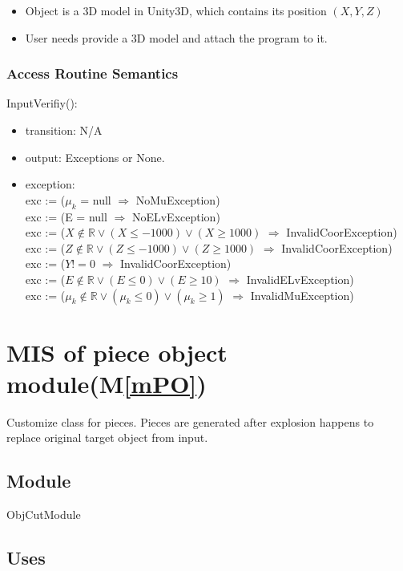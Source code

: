\documentclass[12pt, titlepage]{article}
\newcommand{\mref}[1]{M\ref{#1}}
\begin{document}
\begin{itemize}
	\item Object is a 3D model in Unity3D, which contains its position $(X,Y,Z)$
	\item User needs provide a 3D model and attach the program to it.
\end{itemize}
\subsubsection{Access Routine Semantics}

\noindent InputVerifiy():
\begin{itemize}
\item transition: N/A
\item output: Exceptions or None.
\item exception:\\
exc := ($\mu_{k}$ = null $\Rightarrow $ NoMuException)\\
exc := (E = null $\Rightarrow $ NoELvException)\\
exc := ($X \notin \mathbb{R} \vee (X \le -1000) \vee (X \ge 1000)$ $\Rightarrow $ InvalidCoorException)\\
exc := ($Z \notin \mathbb{R} \vee (Z \le -1000) \vee (Z \ge 1000)$ $\Rightarrow $ InvalidCoorException)\\
exc := ($Y != 0$ $\Rightarrow $ InvalidCoorException)\\
exc := ($E \notin \mathbb{R} \vee (E \leq 0) \vee (E \geq 10)$ $\Rightarrow $ InvalidELvException)\\
exc := ($\mu_{k} \notin \mathbb{R} \vee (\mu_{k} \le 0) \vee (\mu_{k} \ge 1)$ $\Rightarrow $ InvalidMuException)\\
\end{itemize}

\section{MIS of piece object module(\mref{mPO})}

Customize class for pieces. Pieces are generated after explosion happens to replace original target object from input.

\subsection{Module}

ObjCutModule

\subsection{Uses}
\end{document}
